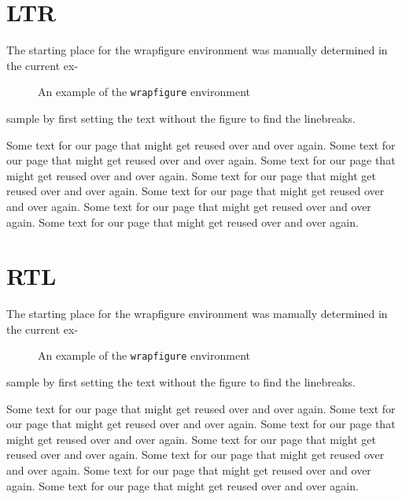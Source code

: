 \documentclass{article}
\newcommand\sample{Some text for our page
  that might get reused over and over again. }
\begin{document}
\section{LTR}
The starting place for the wrapfigure
environment was manually determined in
the current ex-

\begin{wrapfigure}[7]{r}[0.2\width]{0pt}
  \centering
  \caption{An example of the
    \texttt{wrapfigure} environment}
\end{wrapfigure}
sample by first setting the text without
the figure to find the linebreaks.

\sample \sample \sample\sample \sample \sample\sample

\section{RTL}

\setRTL
The starting place for the wrapfigure
environment was manually determined in
the current ex-

\begin{wrapfigure}[7]{l}[0.2\width]{0pt}
  \centering
  \caption{An example of the
    \texttt{wrapfigure} environment}
\end{wrapfigure}
sample by first setting the text without
the figure to find the linebreaks.

\sample \sample \sample\sample \sample \sample\sample
\end{document}
